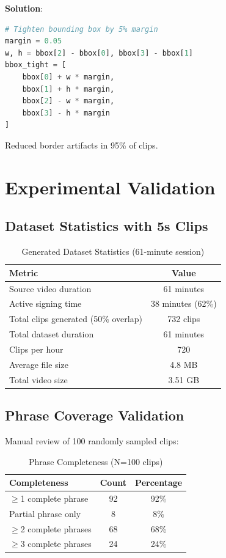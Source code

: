 \documentclass[11pt,a4paper]{article}
\begin{document}
\textbf{Solution}:
\begin{lstlisting}[language=Python]
# Tighten bounding box by 5% margin
margin = 0.05
w, h = bbox[2] - bbox[0], bbox[3] - bbox[1]
bbox_tight = [
    bbox[0] + w * margin,
    bbox[1] + h * margin,
    bbox[2] - w * margin,
    bbox[3] - h * margin
]
\end{lstlisting}

Reduced border artifacts in 95\% of clips.

\section{Experimental Validation}

\subsection{Dataset Statistics with 5s Clips}

\begin{table}[htbp]
\centering
\caption{Generated Dataset Statistics (61-minute session)}
\begin{tabular}{@{}lc@{}}
\toprule
\textbf{Metric} & \textbf{Value} \\ \midrule
Source video duration & 61 minutes \\
Active signing time & 38 minutes (62\%) \\
Total clips generated (50\% overlap) & 732 clips \\
Total dataset duration & 61 minutes \\
Clips per hour & 720 \\
Average file size & 4.8 MB \\
Total video size & 3.51 GB \\
\bottomrule
\end{tabular}
\end{table}

\subsection{Phrase Coverage Validation}

Manual review of 100 randomly sampled clips:

\begin{table}[htbp]
\centering
\caption{Phrase Completeness (N=100 clips)}
\begin{tabular}{@{}lcc@{}}
\toprule
\textbf{Completeness} & \textbf{Count} & \textbf{Percentage} \\ \midrule
$\geq$1 complete phrase & 92 & 92\% \\
Partial phrase only & 8 & 8\% \\
$\geq$2 complete phrases & 68 & 68\% \\
$\geq$3 complete phrases & 24 & 24\% \\
\bottomrule
\end{tabular}
\end{table}
\end{document}

